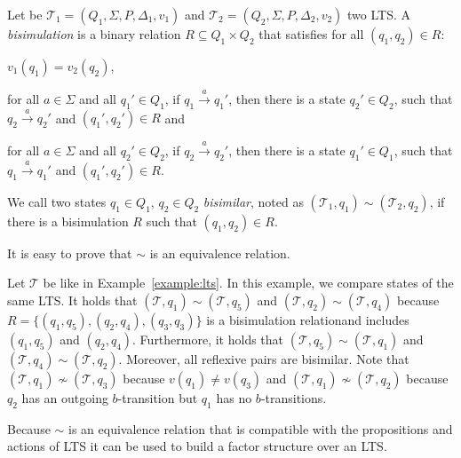 \begin{definition}
    Let be $\mathcal{T}_1 = (Q_1, \Sigma, P, \Delta_1, v_1)$ and $\mathcal{T}_2 = (Q_2, \Sigma, P, \Delta_2, v_2)
    $ two LTS. A \emph{bisimulation} is a binary relation $R \subseteq Q_1 \times Q_2$ that satisfies for all $(q_1,
    q_2) \in R$:
    \begin{compactitem}
        \item $v_1 (q_1) = v_2 (q_2)$,
        \item for all $a \in \Sigma$ and all $q_1' \in Q_1$, if $q_1 \overset{a}{\rightarrow} q_1'$, then there
        is a state $q_2' \in Q_2$, such that $q_2 \overset{a}{\rightarrow} q_2'$ and $(q_1', q_2') \in R$ and
        \item for all $a \in \Sigma$ and all $q_2' \in Q_2$, if $q_2 \overset{a}{\rightarrow} q_2'$, then there is a
        state $q_1' \in Q_1$, such that $q_1 \overset{a}{\rightarrow} q_1'$ and $(q_1', q_2') \in R$.
    \end{compactitem}
    We call two states $q_1 \in Q_1$, $q_2 \in Q_2$ \emph{bisimilar}, noted as $(\mathcal{T}_1, q_1) \sim
    (\mathcal{T}_2, q_2)$, if there
    is a bisimulation $R$ such that $(q_1, q_2) \in R$.
\end{definition}
It is easy to prove that $\sim$ is an equivalence relation. 
\begin{example}
    \label{example:bisimilar}
    Let $\mathcal{T}$ be like in Example~\ref{example:lts}. In this example, we compare states of the same LTS. It holds that $(\mathcal{T}, q_1) \sim (\mathcal{T}, q_5)$ and $(\mathcal{T}, q_2) \sim (\mathcal{T}, q_4)$ because
    $R = \{(q_1, q_5), (q_2, q_4), (q_3, q_3)\}$ is a bisimulation relationand includes $(q_1, q_5)$ and $(q_2, q_4)$.  Furthermore, it holds that $(\mathcal{T}, q_5) \sim (\mathcal{T},
    q_1)$ and $(\mathcal{T}, q_4) \sim (\mathcal{T}, q_2)$. Moreover, all reflexive pairs are bisimilar. Note that
    $(\mathcal{T}, q_1) \not\sim (\mathcal{T}, q_3)$ because $v(q_1) \neq v(q_3)$ and $(\mathcal{T}, q_1)
    \not\sim (\mathcal{T}, q_2)$ because $q_2$ has an outgoing $b$-transition but $q_1$ has no $b$-transitions.
\end{example}

Because $\sim$ is an equivalence relation that is compatible with the propositions and actions of LTS it can be used to build a factor structure over an LTS.

